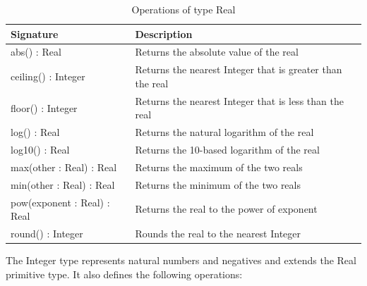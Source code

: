\begin{longtabu} {|p{6.5cm}|X|}
\caption{Operations of type Real}
\label{tab:RealOperations}\\

\hline
    \textbf{Signature} & \textbf{Description} \\\hline
    abs() : Real & Returns the absolute value of the real \\\hline
    
    ceiling() : Integer & Returns the nearest Integer that is greater than the real\\\hline
    
    floor() : Integer & Returns the nearest Integer that is less than the real\\\hline
    
    log() : Real & Returns the natural logarithm of the real \\\hline
    
    log10() : Real & Returns the 10-based logarithm of the real \\\hline
    
    max(other : Real) : Real & Returns the maximum of the two reals \\\hline
    
    min(other : Real) : Real & Returns the minimum of the two reals \\\hline
    
    pow(exponent : Real) : Real & Returns the real to the power of exponent \\\hline
    
    round() : Integer & Rounds the real to the nearest Integer\\\hline
\end{longtabu}

The Integer type represents natural numbers and negatives and extends the Real primitive type. It also defines the following operations:
\\

